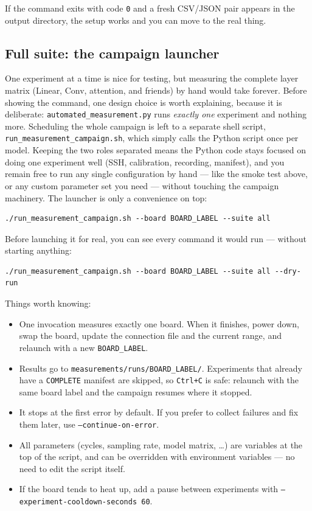 If the command exits with code \texttt{0} and a fresh CSV/JSON pair appears
in the output directory, the setup works and you can move to the real thing.

\subsection{Full suite: the campaign launcher}

One experiment at a time is nice for testing, but measuring the complete
layer matrix (Linear, Conv, attention, and friends) by hand would take
forever. Before showing the command, one design choice is worth explaining,
because it is deliberate: \texttt{automated\_measurement.py} runs
\emph{exactly one} experiment and nothing more. Scheduling the whole
campaign is left to a separate shell script,
\texttt{run\_measurement\_campaign.sh}, which simply calls the Python script
once per model. Keeping the two roles separated means the Python code stays
focused on doing one experiment well (SSH, calibration, recording,
manifest), and you remain free to run any single configuration by hand ---
like the smoke test above, or any custom parameter set you need --- without
touching the campaign machinery. The launcher is only a convenience on top:

\begin{lstlisting}
./run_measurement_campaign.sh --board BOARD_LABEL --suite all
\end{lstlisting}

Before launching it for real, you can see every command it would run ---
without starting anything:

\begin{lstlisting}
./run_measurement_campaign.sh --board BOARD_LABEL --suite all --dry-run
\end{lstlisting}

Things worth knowing:
\begin{itemize}
    \item One invocation measures exactly one board. When it finishes, power
    down, swap the board, update the connection file and the current range,
    and relaunch with a new \texttt{BOARD\_LABEL}.
    \item Results go to \texttt{measurements/runs/BOARD\_LABEL/}. Experiments
    that already have a \texttt{COMPLETE} manifest are skipped, so
    \texttt{Ctrl+C} is safe: relaunch with the same board label and the
    campaign resumes where it stopped.
    \item It stops at the first error by default. If you prefer to collect
    failures and fix them later, use \texttt{--continue-on-error}.
    \item All parameters (cycles, sampling rate, model matrix, \dots) are
    variables at the top of the script, and can be overridden with
    environment variables --- no need to edit the script itself.
    \item If the board tends to heat up, add a pause between experiments
    with \texttt{--experiment-}\allowbreak\texttt{cooldown-seconds 60}.
\end{itemize}

